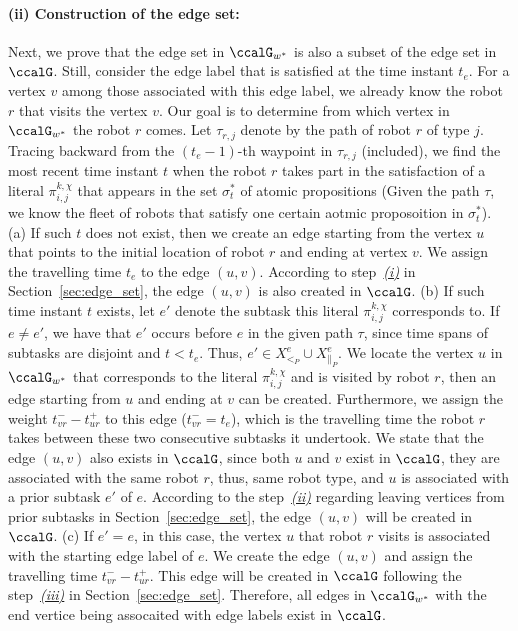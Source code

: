 \documentclass[Afour,sageh,times]{sagej}
\renewcommand{\ap}[3]{\mathcal{\pi}_{{#1},{#2}}^{#3}}
\begin{document}
{\paragraph{(ii) Construction of the edge set:} Next, we prove that the edge set in $\ccalG_{w^*}$ is also a subset of the edge set in $\ccalG$. Still, consider the edge label that is satisfied at the time instant $t_e$. For a vertex $v$ among those associated with this edge label, we already know the robot $r$ that visits the vertex $v$. Our goal is to determine from which vertex in $\ccalG_{w^*}$ the robot $r$ comes. Let $\tau_{r,j}$ denote by the path of robot $r$ of type $j$. Tracing backward from the $(t_{e}-1)$-th waypoint in $\tau_{r,j}$ (included), we find the most recent time instant $t$  when the robot $r$ takes part in the satisfaction of a literal $\ap{i}{j}{k,\chi}$ that appears in the set $\sigma^*_{t}$ of atomic propositions (Given the path $\tau$, we know the fleet of robots that satisfy one certain aotmic proposoition in $\sigma^*_t$). (a) If such $t$ does not exist, then we create an edge starting from the vertex $u$ that points to the initial location of robot $r$ and ending at vertex $v$. We assign the travelling time  $t_e$ to the edge $(u,v)$. According to step~\hyperref[sec:a]{\it (i)} in Section~\ref{sec:edge_set}, the edge $(u,v)$ is  also  created in $\ccalG$. (b) If such time instant $t$ exists, let $e'$ denote the subtask this literal $\ap{i}{j}{k,\chi}$ corresponds to. If $e\neq e'$, we have that $e'$ occurs before $e$ in the given path $\tau$, since time spans of subtasks are disjoint and $t < t_e$. Thus, $e' \in X_{<_P}^{e} \cup X_{\|_P}^e$. We locate the vertex $u$ in $\ccalG_{w^*}$ that corresponds to the literal $\ap{i}{j}{k,\chi}$ and is visited by robot $r$, then an edge starting from $u$ and ending at $v$ can be created. Furthermore, we assign the weight $t_{vr}^- - t_{ur}^+$ to this edge ($t_{vr}^-=t_e$), which is the travelling time the robot $r$ takes between these two consecutive subtasks it undertook. We state that the edge $(u, v)$ also exists in $\ccalG$, since both $u$ and $v$ exist in $\ccalG$, they are associated with the same robot $r$, thus, same robot type, and $u$ is associated with a prior subtask $e'$ of $e$. According to the step~\hyperref[sec:b]{\it (ii)} regarding leaving vertices from prior subtasks in Section~\ref{sec:edge_set}, the edge $(u,v)$ will be created in $\ccalG$. (c) If $e'=e$, in this case, the vertex $u$ that robot $r$ visits is associated with the starting edge label of $e$. We create the edge $(u,v)$ and assign the travelling time  $t_{vr}^- - t_{ur}^+$. This edge will be created in $\ccalG$ following the step~\hyperref[sec:c]{\it (iii)} in Section~\ref{sec:edge_set}. Therefore, all edges in $\ccalG_{w^*}$ with the end vertice being assocaited with edge labels exist in $\ccalG$.

}
\end{document}

